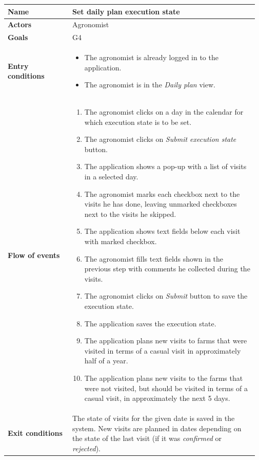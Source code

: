 \begin{longtable}{@{}p{0.25\linewidth} p{0.72\linewidth}@{}}
	\toprule
	\textbf{Name}               & Set daily plan execution state \\
	\midrule
	\textbf{Actors}             & Agronomist\\
	\midrule
	\textbf{Goals}              & G4 \\
	\midrule
	
	\textbf{Entry conditions}   & \begin{itemize}[leftmargin=.4cm,noitemsep,topsep=0pt,before=\vspace{-3mm},after=\vspace{-4mm}]
	    \item The agronomist is already logged in to the application.
	    \item The agronomist is in the \textit{Daily plan} view.
	\end{itemize}\\
	\midrule
	
	\textbf{Flow of events}     & \begin{enumerate}[leftmargin=.4cm,noitemsep,topsep=0pt,before=\vspace{-3mm},after=\vspace{-4mm}]
	    \item The agronomist clicks on a day in the calendar for which execution state is to be set.
	    \item The agronomist clicks on \textit{Submit execution state} button.
	    \item The application shows a pop-up with a list of visits in a selected day.
	    \item The agronomist marks each checkbox next to the visits he has done, leaving unmarked checkboxes next to the visits he skipped.
	    \item The application shows text fields below each visit with marked checkbox.
	    \item The agronomist fills text fields shown in the previous step with comments he collected during the visits.
	    \item The agronomist clicks on \textit{Submit} button to save the execution state.
	    \item The application saves the execution state.
	    \item The application plans new visits to farms that were visited in terms of a casual visit in approximately half of a year.
	    \item The application plans new visits to the farms that were not visited, but should be visited in terms of a casual visit, in approximately the next 5 days.
	\end{enumerate}\\
	\midrule
	\textbf{Exit conditions}    & The state of visits for the given date is saved in the system. New visits are planned in dates depending on the state of the last visit (if it was \textit{confirmed} or \textit{rejected}). \\
	\midrule
	

\end{longtable}
